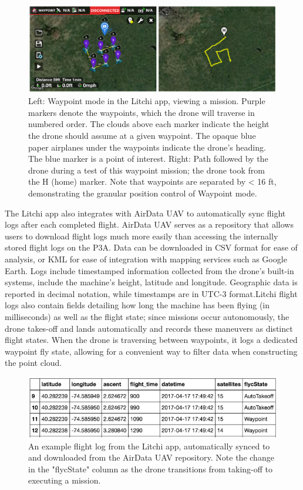 \documentclass[pageno]{jpaper}
\begin{document}
\begin{figure}[h]
	\caption{Left: Waypoint mode in the Litchi app, viewing a mission. Purple markers denote the waypoints, which the drone will traverse in numbered order. The clouds above each marker indicate the height the drone should assume at a given waypoint. The opaque blue paper airplanes under the waypoints indicate the drone's heading. The blue marker is a point of interest. Right: Path followed by the drone during a test of this waypoint mission; the drone took from the H (home) marker. Note that waypoints are separated by < 16 ft, demonstrating the granular position control of Waypoint mode.}
	\includegraphics{waypoint}
	\centering
\end{figure}

The Litchi app also integrates with AirData UAV to automatically sync flight logs after each completed flight. AirData UAV serves as a repository that allows users to download flight logs much more easily than accessing the internally stored flight logs on the P3A. Data can be downloaded in CSV format for ease of analysis, or KML for ease of integration with mapping services such as Google Earth. Logs include timestamped information collected from the drone's built-in systems, include the machine's height, latitude and longitude. Geographic data is reported in decimal notation, while timestamps are in UTC-3 format.Litchi flight logs also contain fields detailing how long the machine has been flying (in milliseconds) as well as the flight state; since missions occur autonomously, the drone takes-off and lands automatically and records these maneuvers as distinct flight states. When the drone is traversing between waypoints, it logs a dedicated waypoint fly state, allowing for a convenient way to filter data when constructing the point cloud. 

\begin{figure}[h]
	\caption{An example flight log from the Litchi app, automatically synced to and downloaded from the AirData UAV repository. Note the change in the "flycState" column as the drone transitions from taking-off to executing a mission.}
	\includegraphics{flight_log}
	\centering
\end{figure}
\end{document}
